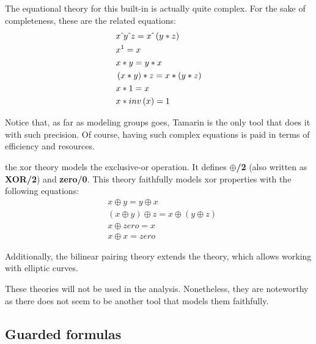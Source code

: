 \begin{description}[style=nextline]
    The equational theory for this built-in is actually quite complex. For the sake of completeness, these are the related equations:
    \begin{equation}
      \begin{aligned}
         & x \hat{\mkern6mu} y \hat{\mkern6mu} z = x \hat{\mkern6mu} \left(y * z\right) \\
         & x ^ 1 = x                                         \\
         & x * y = y * x                                     \\
         & \left(x * y\right) * z = x * \left(y * z\right)   \\
         & x * 1 = x                                         \\
         & x * inv\left(x\right) = 1
      \end{aligned}
    \end{equation}

    Notice that, as far as modeling groups goes, Tamarin is the only tool that does it with such precision. Of course, having such complex equations is paid in terms of efficiency and resources.
  \item[xor and bilinear-pairing] the xor theory models the exclusive-or operation. It defines \textbf{$\oplus$/2} (also written as \textbf{XOR/2}) and \textbf{zero/0}. This theory faithfully models xor properties with the following equations:
    \begin{equation}
      \begin{aligned}
         & x \oplus y = y \oplus x                                             \\
         & \left(x \oplus y\right) \oplus z = x \oplus \left(y \oplus z\right) \\
         & x \oplus zero = x                                                   \\
         & x \oplus x = zero
      \end{aligned}
    \end{equation}

    Additionally, the bilinear pairing theory extends the \DiHe{} theory, which allows working with elliptic curves.

    These theories will not be used in the analysis. Nonetheless, they are noteworthy as there does not seem to be another tool that models them faithfully.
\end{description}

\subsection{Guarded formulas}
\label{sub:guarded-formulas}

